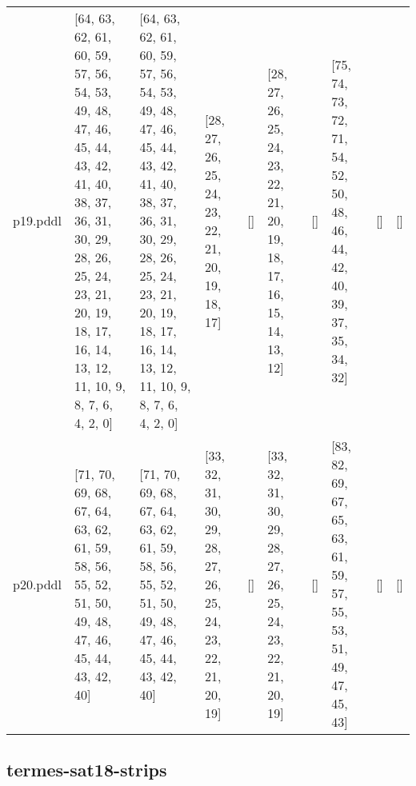 \documentclass{article}
\begin{document}
\begin{tabular}{@{}lrrrrrrrrr@{}}
p19.pddl & \multicolumn{1}{|l|}{[64, 63, 62, 61, 60, 59, 57, 56, 54, 53, 49, 48, 47, 46, 45, 44, 43, 42, 41, 40, 38, 37, 36, 31, 30, 29, 28, 26, 25, 24, 23, 21, 20, 19, 18, 17, 16, 14, 13, 12, 11, 10, 9, 8, 7, 6, 4, 2, 0]} & \multicolumn{1}{|l|}{[64, 63, 62, 61, 60, 59, 57, 56, 54, 53, 49, 48, 47, 46, 45, 44, 43, 42, 41, 40, 38, 37, 36, 31, 30, 29, 28, 26, 25, 24, 23, 21, 20, 19, 18, 17, 16, 14, 13, 12, 11, 10, 9, 8, 7, 6, 4, 2, 0]} & \multicolumn{1}{|l|}{[28, 27, 26, 25, 24, 23, 22, 21, 20, 19, 18, 17]} & \multicolumn{1}{|l|}{[]} & \multicolumn{1}{|l|}{[28, 27, 26, 25, 24, 23, 22, 21, 20, 19, 18, 17, 16, 15, 14, 13, 12]} & \multicolumn{1}{|l|}{[]} & \multicolumn{1}{|l|}{[75, 74, 73, 72, 71, 54, 52, 50, 48, 46, 44, 42, 40, 39, 37, 35, 34, 32]} & \multicolumn{1}{|l|}{[]} & \multicolumn{1}{|l|}{[]} \\
p20.pddl & \multicolumn{1}{|l|}{[71, 70, 69, 68, 67, 64, 63, 62, 61, 59, 58, 56, 55, 52, 51, 50, 49, 48, 47, 46, 45, 44, 43, 42, 40]} & \multicolumn{1}{|l|}{[71, 70, 69, 68, 67, 64, 63, 62, 61, 59, 58, 56, 55, 52, 51, 50, 49, 48, 47, 46, 45, 44, 43, 42, 40]} & \multicolumn{1}{|l|}{[33, 32, 31, 30, 29, 28, 27, 26, 25, 24, 23, 22, 21, 20, 19]} & \multicolumn{1}{|l|}{[]} & \multicolumn{1}{|l|}{[33, 32, 31, 30, 29, 28, 27, 26, 25, 24, 23, 22, 21, 20, 19]} & \multicolumn{1}{|l|}{[]} & \multicolumn{1}{|l|}{[83, 82, 69, 67, 65, 63, 61, 59, 57, 55, 53, 51, 49, 47, 45, 43]} & \multicolumn{1}{|l|}{[]} & \multicolumn{1}{|l|}{[]} \\
\end{tabular}

\hypertarget{h_values-termes-sat18-strips}{}
\subsection*{termes-sat18-strips}
\end{document}
